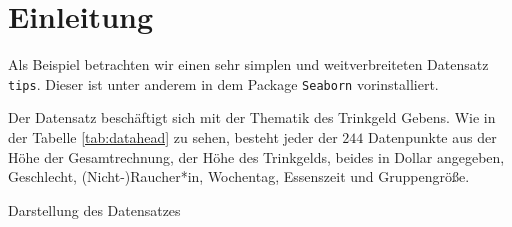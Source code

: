 \section{Einleitung}

Als Beispiel betrachten wir einen sehr simplen und weitverbreiteten Datensatz \lstinline{tips}. Dieser ist unter anderem in dem Package \lstinline{Seaborn} vorinstalliert.

Der Datensatz beschäftigt sich mit der Thematik des Trinkgeld Gebens. Wie in der Tabelle \ref{tab:datahead} zu sehen, besteht jeder der $244$ Datenpunkte aus der Höhe der Gesamtrechnung, der Höhe des Trinkgelds, beides in Dollar angegeben, Geschlecht, (Nicht-)Raucher*in, Wochentag, Essenszeit und Gruppengröße.


\begin{table}
    \centering
    
    \caption{Darstellung des Datensatzes}
    \label{tab:datahead}
\end{table}
